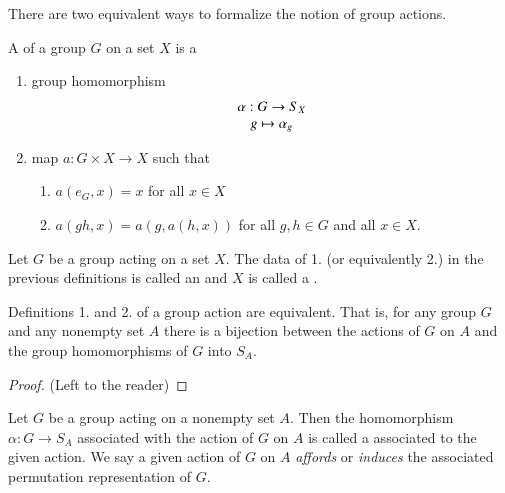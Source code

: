 \begin{rmk}
        There are two equivalent ways to formalize the notion of group actions.
\end{rmk}

\begin{defn}
        A  of a group $G$ on a set $X$ is a \begin{enumerate}
                \item group homomorphism \begin{equation}
                                \begin{array}{c} \alpha:G\rightarrow S_X \\ g\mapsto \alpha_g \end{array}
                \end{equation}
                \item map $a:G\times X \rightarrow X$ such that \begin{enumerate}
                                \item $a(e_G,x) = x$ for all $x \in X$
                                \item $a(gh,x) = a(g,a(h,x))$ for all $g,h \in G$ and all $x \in X$.
                \end{enumerate}
        \end{enumerate}
\end{defn}

\begin{defn}
        Let $G$ be a group acting on a set $X$. The data of 1. (or equivalently 2.) in the previous definitions is called an  and $X$ is called a .
\end{defn}

\begin{claim}
        Definitions 1. and 2. of a group action are equivalent. That is, for any group $G$ and any nonempty set $A$ there is a bijection between the actions of $G$ on $A$ and the group homomorphisms of $G$ into $S_A$.
\end{claim}
\begin{proof}
        (Left to the reader)
\end{proof}


\begin{defn}
    Let $G$ be a group acting on a nonempty set $A$. Then the homomorphism $\alpha:G\rightarrow S_A$ associated with the action of $G$ on $A$ is called a  associated to the given action. We say a given action of $G$ on $A$ \emph{affords} or \emph{induces} the associated permutation representation of $G$.
\end{defn}


